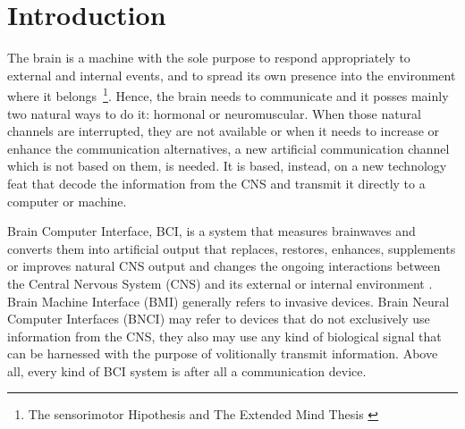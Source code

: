 \chapter*{Introduction}



The brain is a machine with the sole purpose to respond appropriately to external and internal events, and to spread its own presence into the environment where it belongs~\footnote{The sensorimotor Hipothesis \cite{young1970,WolpawJonathanR2012} and The Extended Mind Thesis \cite{clark2008}}.  Hence, the brain needs to communicate and it posses mainly two natural ways to do it: hormonal or neuromuscular.  When those natural channels are interrupted, they are not available or when it needs to increase or enhance the communication alternatives, a new artificial communication channel which is not based on them, is needed. It is based, instead, on a new technology feat that decode the information from the CNS and transmit it directly to a computer or machine.

Brain Computer Interface, BCI, is a system that measures brainwaves and converts them into artificial output that replaces, restores, enhances, supplements or improves natural CNS output and changes the ongoing interactions between the Central Nervous System (CNS) and its external or internal environment \cite{WolpawJonathanR2012}. Brain Machine Interface (BMI) generally refers to invasive devices. Brain Neural Computer Interfaces (BNCI) may refer to devices that do not exclusively use information from the CNS, they also may use any kind of biological signal that can be harnessed with the purpose of volitionally transmit information. Above all, every kind of BCI system is after all a communication device.

